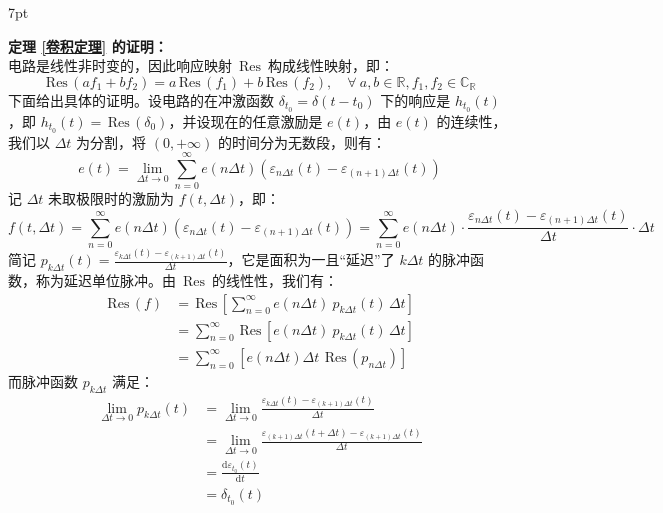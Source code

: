 \documentclass[UTF8]{report}
\def\Res{\,\mathrm{Res}\,}
\def\R{\mathbb{R}}
\def\C{\mathbb{C}}
\theoremstyle{MyLineTheoremStyle} %
\theoremstyle{MyBlockTheoremStyle} %
\theoremstyle{MySubsubsectionStyle} %
\newenvironment{graybox}{%
        \def\FrameCommand{%
        \hspace{1pt}%
        {\color{gray}\small \vrule width 2pt}%
        {\color{graybox_color}\vrule width 4pt}%
        \colorbox{graybox_color}%
        }%
        \MakeFramed{\advance\hsize-\width\FrameRestore}%
        \noindent\hspace{-4.55pt}%
        \begin{adjustwidth}{}{7pt}%
        \vspace{2pt}\vspace{2pt}%
        }
        {%
        \vspace{2pt}\end{adjustwidth}\endMakeFramed%
        }
\begin{document}
\begin{graybox}
\textbf{定理 \ref{卷积定理} 的证明：}\\
电路是线性非时变的，因此响应映射 $\Res$ 构成线性映射，即：
\begin{equation}
\Res (af_1 + bf_2) = a\Res(f_1) + b\Res(f_2),\quad \forall\ a, b\in \R, f_1, f_2 \in \C_{\R}
\end{equation}
下面给出具体的证明。设电路的在冲激函数 $\delta_{t_0} = \delta (t - t_0)$ 下的响应是 $h_{t_0}(t)$，即 $h_{t_0}(t) = \Res (\delta_0)$，并设现在的任意激励是 $e(t)$，由 $e(t)$ 的连续性，我们以 $\Delta t$ 为分割，将 $(0, +\infty)$ 的时间分为无数段，则有：
\begin{equation}
e(t) = \lim_{\Delta t \to 0}\sum_{n=0}^{\infty} e(n \Delta t) \left(\varepsilon_{n\Delta t} (t) - \varepsilon_{(n+1)\Delta t} (t) \right)
\end{equation}
记 $\Delta t$ 未取极限时的激励为 $f(t, \Delta t)$，即：
\begin{equation}
f(t, \Delta t) = \sum_{n=0}^{\infty} e(n \Delta t) \left(\varepsilon_{n\Delta t} (t) - \varepsilon_{(n+1)\Delta t} (t) \right) = \sum_{n=0}^{\infty} e(n \Delta t) \cdot \frac{\varepsilon_{n\Delta t} (t) - \varepsilon_{(n+1)\Delta t} (t)}{\Delta t} \cdot \Delta t
\end{equation}
简记 $p_{k\Delta t}(t) = \frac{\varepsilon_{k\Delta t} (t) - \varepsilon_{(k+1)\Delta t} (t)}{\Delta t}$，它是面积为一且“延迟”了 $k\Delta t$ 的脉冲函数，称为延迟单位脉冲。由 $\Res$ 的线性性，我们有：
\begin{align}
\Res (f) 
&= \Res \left[\sum_{n=0}^{\infty} e(n \Delta t) \ p_{k\Delta t}(t)\, \Delta t \right] \\
&= \sum_{n=0}^{\infty} \Res \left[ e(n \Delta t) \ p_{k\Delta t}(t)\, \Delta t \right] \\ \label{for:卷积定理证明1}
&= \sum_{n=0}^{\infty} \left[ e(n \Delta t) \Delta t\   \Res (p_{n\Delta t}) \right]
\end{align}
而脉冲函数 $p_{k \Delta t}$ 满足：
\begin{align}
    \lim_{\Delta t \to 0} p_{k\Delta t}(t) 
    &= \lim_{\Delta t \to 0} \frac{\varepsilon_{k\Delta t} (t) - \varepsilon_{(k+1)\Delta t} (t)}{\Delta t} \\
    &= \lim_{\Delta t \to 0} \frac{\varepsilon_{(k+1)\Delta t} (t + \Delta t) - \varepsilon_{(k+1)\Delta t} (t)}{\Delta t}\\ 
    &= \frac{\mathrm{d} \varepsilon_{t_0}(t) }{\mathrm{d} t } \\ 
    &=\delta_{t_0}(t)
\end{align}

\end{graybox}
\end{document}
